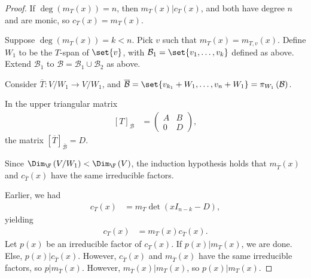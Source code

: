\documentclass[10pt]{mypackage}
\begin{document}
\begin{proof}
  If $\deg\left(m_T(x)\right) = n$, then $ m_T(x)|c_T(x)$, and both have degree $n$ and are monic, so $c_T(x) = m_T(x)$.\newline

  Suppose $\deg\left(m_T(x)\right) = k < n$. Pick $v$ such that $m_T(x) = m_{T,v}(x)$. Define $W_1$ to be the $T$-span of $\set{v}$, with $\mathcal{B}_1 = \set{v_1,\dots,v_k}$ defined as above. Extend $\mathcal{B}_1$ to $\mathcal{B} = \mathcal{B}_1 \cup \mathcal{B}_2$ as above.\newline

  Consider $\overline{T}: V/W_1 \rightarrow V/W_1$, and $\overline{\mathcal{B}} = \set{v_{k_1}+W_1,\dots,v_{n}+W_1}=  \pi_{W_1}\left(\mathcal{B}\right)$.\newline

  In the upper triangular matrix
  \begin{align*}
    \left[T\right]_{\mathcal{B}} &= \begin{pmatrix}A & B \\ 0 & D\end{pmatrix},
  \end{align*}
  the matrix $\left[\overline{T}\right]_{\overline{\mathcal{B}}} = D$.\newline

  Since $\Dim_{\F}\left(V/W_1\right) < \Dim_{\F}\left(V\right)$, the induction hypothesis holds that $m_{\overline{T}}(x)$ and $c_{\overline{T}}(x)$ have the same irreducible factors.\newline

  Earlier, we had
  \begin{align*}
    c_{T}(x) &= m_{T}\det\left(xI_{n-k}-D\right),
  \end{align*}
  yielding
  \begin{align*}
    c_{T}(x) &= m_{T}(x)c_{\overline{T}}(x).
  \end{align*}
  Let $p(x)$ be an irreducible factor of $c_{T}(x)$. If $p(x)|m_{T}(x)$, we are done. Else, $p(x)|c_{\overline{T}}(x)$. However, $c_{\overline{T}}(x)$ and $m_{\overline{T}}(x)$ have the same irreducible factors, so $p|m_{\overline{T}}(x)$. However, $m_{\overline{T}}(x)|m_{T}(x)$, so $p(x)|m_{T}(x)$.
\end{proof}
\end{document}
